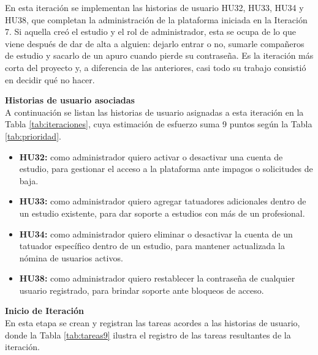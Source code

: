 \documentclass[12pt,letterpaper,oneside]{report}
\newcommand{\tituloparpegado}[1]{\par\textbf{#1}\\\indent\ignorespaces}
\begin{document}
En esta iteración se implementan las historias de usuario HU32, HU33, HU34 y HU38, que completan la administración de la plataforma iniciada en la Iteración 7. Si aquella creó el estudio y el rol de administrador, esta se ocupa de lo que viene después de dar de alta a alguien: dejarlo entrar o no, sumarle compañeros de estudio y sacarlo de un apuro cuando pierde su contraseña. Es la iteración más corta del proyecto y, a diferencia de las anteriores, casi todo su trabajo consistió en decidir qué no hacer.

\vspace{0.3cm}
\tituloparpegado{Historias de usuario asociadas}
A continuación se listan las historias de usuario asignadas a esta iteración en la Tabla \ref{tab:iteraciones}, cuya estimación de esfuerzo suma 9 puntos según la Tabla \ref{tab:prioridad}.

\begin{itemize}
  \item \textbf{HU32:} como administrador quiero activar o desactivar una cuenta de estudio, para gestionar el acceso a la plataforma ante impagos o solicitudes de baja.
  \item \textbf{HU33:} como administrador quiero agregar tatuadores adicionales dentro de un estudio existente, para dar soporte a estudios con más de un profesional.
  \item \textbf{HU34:} como administrador quiero eliminar o desactivar la cuenta de un tatuador específico dentro de un estudio, para mantener actualizada la nómina de usuarios activos.
  \item \textbf{HU38:} como administrador quiero restablecer la contraseña de cualquier usuario registrado, para brindar soporte ante bloqueos de acceso.
\end{itemize}

\vspace{0.3cm}
\tituloparpegado{Inicio de Iteración}
En esta etapa se crean y registran las tareas acordes a las historias de usuario, donde la Tabla \ref{tab:tareas9} ilustra el registro de las tareas resultantes de la iteración.
\end{document}
